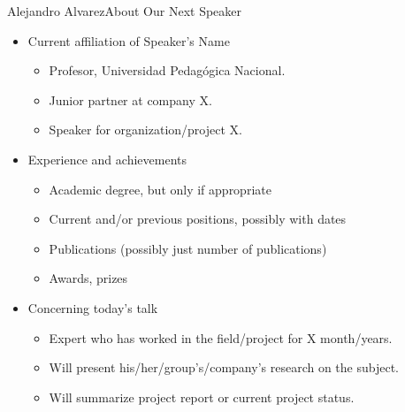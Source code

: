 \documentclass{beamer}
\begin{document}
\begin{frame}{Alejandro Alvarez}{About Our Next Speaker}

  \begin{itemize}
  \item
    Current affiliation of Speaker's Name

    \begin{itemize}
    \item
      Profesor, Universidad Pedagógica Nacional.
    \item
      Junior partner at company X.
    \item
      Speaker for organization/project X.
    \end{itemize}
  \item
    Experience and achievements

    \begin{itemize}
    \item
      Academic degree, but only if appropriate
    \item
      Current and/or previous positions, possibly with dates
    \item
      Publications (possibly just number of publications)
    \item
      Awards, prizes
    \end{itemize}
  \item
    Concerning today's talk

    \begin{itemize}
    \item
      Expert who has worked in the field/project for X month/years.
    \item
      Will present his/her/group's/company's research on the subject.
    \item
      Will summarize project report or current project status.
    \end{itemize}
  \end{itemize}  
\end{frame}
\end{document}
